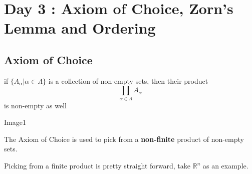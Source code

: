 \section{Day 3 : Axiom of Choice, Zorn's Lemma and Ordering}
\subsection{Axiom of Choice}
\begin{theorem}
    if $\{A_\alpha\vert \alpha\in\Lambda\}$ is a collection of non-empty sets, then their product
    \[\prod_{\alpha\in\Lambda}A_\alpha\]
    is non-empty as well
\end{theorem}
Image1
\begin{remark}
    The Axiom of Choice is used to pick from a \textbf{non-finite} product of non-empty sets.
\end{remark}
Picking from a finite product is pretty straight forward, take $\mathbb{R}^n$ as an example.
